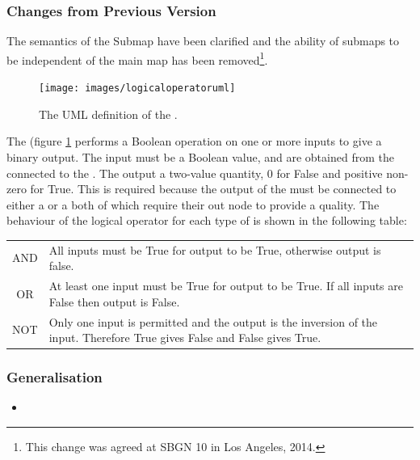 \subsubsection{Changes from Previous Version}

The semantics of the Submap have been clarified and the ability of
submaps to be independent of the main map has been removed\footnote{This
  change was agreed at SBGN 10 in Los Angeles, 2014.}.

\label{sec:techref:logic}
\label{defn:LogicalOperator}

\begin{figure}[htb]
  \centering
  \texttt{[image: images/logicaloperatoruml]}
  \caption{The UML definition of the .}
  \label{fig:techref:logicaloperatoruml}
\end{figure}

 The  (figure \ref{fig:techref:logicaloperatoruml} performs a Boolean operation on one or
more inputs to give a binary output. The input must be a Boolean
value, and are obtained from the  connected to the
. The output a two-value quantity,  0 for False and positive
non-zero for True. This is required because the output of the
 must be connected to either a
 or a  both of which
require their out node to provide a quality. The behaviour of the
logical operator for each type of  is shown in
the following table:

\begin{tabular}[t]{c p{12cm}}
\toprule
AND & All inputs must be True for output to be True, otherwise output
is false.\\
OR & At least one input must be True for output to be True. If all
inputs are False then output is False.\\
NOT & Only one input is permitted and the output is the inversion of
the input. Therefore True gives False and False gives True.\\
\bottomrule
\end{tabular}

\subsubsection{Generalisation}

\begin{itemize}
\item {}
\end{itemize}

